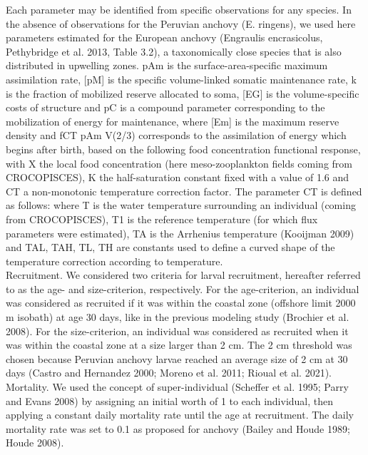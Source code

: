 Each parameter may be identified from specific observations for any species. In the
absence of observations for the Peruvian anchovy (E. ringens), we used here parameters
estimated for the European anchovy (Engraulis encrasicolus, Pethybridge et al. 2013, Table 3.2), a taxonomically close species that is also distributed in upwelling zones. pAm
is the surface-area-specific maximum assimilation rate, [pM] is the specific volume-linked
somatic maintenance rate, k is the fraction of mobilized reserve allocated to soma, [EG]
is the volume-specific costs of structure and pC is a compound parameter corresponding
to the mobilization of energy for maintenance, where [Em] is the maximum reserve density and fCT pAm V(2/3) corresponds to the assimilation of energy which begins after birth, based on the following food concentration functional response, with X the local food concentration (here meso-zooplankton fields coming from CROCOPISCES),
K the half-saturation constant fixed with a value of 1.6 and CT a non-monotonic
temperature correction factor. The parameter CT is defined as follows: where T is the water temperature surrounding an individual (coming from CROCOPISCES),
T1 is the reference temperature (for which flux parameters were estimated),
TA is the Arrhenius temperature (Kooijman 2009) and TAL, TAH, TL, TH are constants used to define a curved shape of the temperature correction according to temperature.\\

Recruitment. We considered two criteria for larval recruitment, hereafter referred to as the
age- and size-criterion, respectively. For the age-criterion, an individual was considered
as recruited if it was within the coastal zone (offshore limit 2000 m isobath) at age 30
days, like in the previous modeling study (Brochier et al. 2008). For the size-criterion, an
individual was considered as recruited when it was within the coastal zone at a size larger
than 2 cm. The 2 cm threshold was chosen because Peruvian anchovy larvae reached
an average size of 2 cm at 30 days (Castro and Hernandez 2000; Moreno et al. 2011;
Rioual et al. 2021). Mortality. We used the concept of super-individual (Scheffer et al.
1995; Parry and Evans 2008) by assigning an initial worth of 1 to each individual, then
applying a constant daily mortality rate until the age at recruitment. The daily mortality
rate was set to 0.1 as proposed for anchovy (Bailey and Houde 1989; Houde 2008).

